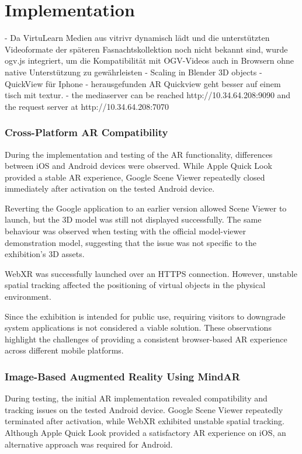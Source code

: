 \chapter{Implementation}

- Da VirtuLearn Medien aus vitrivr dynamisch lädt und die unterstützten Videoformate der späteren Fasnachtskollektion noch nicht bekannt sind, wurde ogv.js integriert, um die Kompatibilität mit OGV-Videos auch in Browsern ohne native Unterstützung zu gewährleisten
- Scaling in Blender 3D objects
- QuickView für Iphone
- herausgefunden AR Quickview geht besser auf einem tisch mit textur.
- the mediaserver can be reached http://10.34.64.208:9090 and the request server at http://10.34.64.208:7070 \cite{noauthor_bcs-vr-museumsrcinfrast ructurevitrivrvitrivrsettingscs_nodate}

\subsection*{Cross-Platform AR Compatibility}
During the implementation and testing of the AR functionality, differences between iOS and Android devices were observed. While Apple Quick Look provided a stable AR experience, Google Scene Viewer repeatedly closed immediately after activation on the tested Android device.

Reverting the Google application to an earlier version allowed Scene Viewer to launch, but the 3D model was still not displayed successfully. The same behaviour was observed when testing with the official model-viewer demonstration model, suggesting that the issue was not specific to the exhibition's 3D assets.

WebXR was successfully launched over an HTTPS connection. However, unstable spatial tracking affected the positioning of virtual objects in the physical environment.

Since the exhibition is intended for public use, requiring visitors to downgrade system applications is not considered a viable solution. These observations highlight the challenges of providing a consistent browser-based AR experience across different mobile platforms.


\subsection*{Image-Based Augmented Reality Using MindAR}
During testing, the initial AR implementation revealed compatibility and tracking issues on the tested Android device. Google Scene Viewer repeatedly terminated after activation, while WebXR exhibited unstable spatial tracking. Although Apple Quick Look provided a satisfactory AR experience on iOS, an alternative approach was required for Android.

